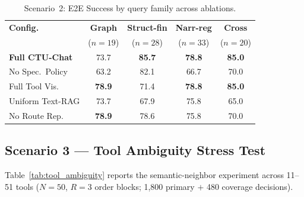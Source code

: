 \begin{table}[!htbp]
\centering
\caption{Scenario~2: E2E Success by query family across ablations.}
\label{tab:ablation_breakdown}
{\small\setlength{\tabcolsep}{4pt}
\begin{tabular}{lcccc}
\toprule
\textbf{Config.} & \textbf{Graph} & \textbf{Struct-fin} & \textbf{Narr-reg} & \textbf{Cross} \\
 & ($n{=}19$) & ($n{=}28$) & ($n{=}33$) & ($n{=}20$) \\
\midrule
\textbf{Full CTU-Chat} & 73.7 & \textbf{85.7} & \textbf{78.8} & \textbf{85.0} \\
No Spec.~Policy  & 63.2 & 82.1 & 66.7 & 70.0 \\
Full Tool Vis.   & \textbf{78.9} & 71.4 & \textbf{78.8} & \textbf{85.0} \\
Uniform Text-RAG & 73.7 & 67.9 & 75.8 & 65.0 \\
No Route Rep.    & \textbf{78.9} & 78.6 & 75.8 & 70.0 \\
\bottomrule
\end{tabular}}
\end{table}

\subsection{Scenario 3 --- Tool Ambiguity Stress Test}
\label{sec:s3_results}

Table~\ref{tab:tool_ambiguity} reports the semantic-neighbor experiment across 11--51 tools ($N{=}50$, $R{=}3$ order blocks; 1,800 primary $+$ 480 coverage decisions).


